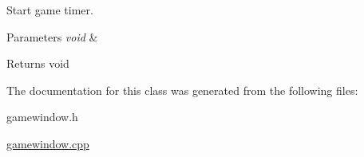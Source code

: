 Start game timer. 


\begin{DoxyParams}{Parameters}
{\em void} & \\
\hline
\end{DoxyParams}
\begin{DoxyReturn}{Returns}
void 
\end{DoxyReturn}


The documentation for this class was generated from the following files\+:\begin{DoxyCompactItemize}
\item 
gamewindow.\+h\item 
\mbox{\hyperlink{gamewindow_8cpp}{gamewindow.\+cpp}}\end{DoxyCompactItemize}
